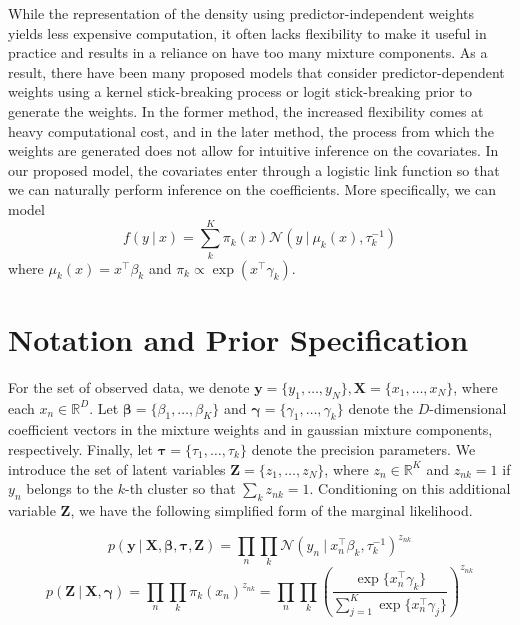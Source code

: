 \documentclass[twoside,11pt]{article}
\newcommand\given[1][]{\:#1\vert\:}
\newcommand{\transpose}[1]{#1^{\intercal}}
\newcommand{\R}{\mathbb{R}}
\newcommand{\nprod}{\prod_{n}}
\newcommand{\kprod}{\prod_{k}}
\newcommand{\boldbeta}{\boldsymbol\beta}
\newcommand{\boldgamma}{\boldsymbol\gamma}
\newcommand{\boldtau}{\boldsymbol\tau}
\newcommand{\sumexp}{\sum_{j=1}^{K} \exp \{ \transpose{x_n} \gamma_j \}}
\begin{document}
While the representation of the density using predictor-independent weights yields less expensive computation, it often lacks flexibility to make it useful in practice and results in a reliance on have too many mixture components. As a result, there have been many proposed models that consider predictor-dependent weights using a kernel stick-breaking process \parencite{dunsonpark:08} or logit stick-breaking prior \parencite{durante:17} to generate the weights. In the former method, the increased flexibility comes at heavy computational cost, and in the later method, the process from which the weights are generated does not allow for intuitive inference on the covariates. In our proposed model, the covariates enter through a logistic link function so that we can naturally perform inference on the coefficients. More specifically, we can model
\begin{equation} \label{eq:covdep_gm}
	 f(y \given x) = \sum_{k}^{K} \pi_k(x) \mathcal{N} \left( y \given \mu_k(x), \tau_k^{-1} \right) 
\end{equation} 
where $\mu_k(x) = \transpose{x} \beta_k$ and $\pi_{k} \propto \exp(\transpose{x} \gamma_k)$. 

\section{Notation and Prior Specification}
For the set of observed data, we denote $\mathbf{y} = \{y_1, \ldots, y_N \}, \mathbf{X} = \{ x_1, \ldots, x_N \}$, where each $x_n \in \R^{D}$. Let $\boldbeta = \{ \beta_1, \ldots, \beta_K\}$ and $\boldgamma = \{ \gamma_1, \ldots, \gamma_k\}$ denote the $D$-dimensional coefficient vectors  in the mixture weights and in gaussian mixture components, respectively. Finally, let $\boldtau = \{ \tau_1, \ldots, \tau_k \}$ denote the precision parameters. We introduce the set of latent variables $\mathbf{Z} = \{ z_1, \ldots, z_N \}$, where $z_n \in \R^K$ and $z_{nk} = 1$ if $y_n$ belongs to the $k$-th cluster so that $\sum_{k} z_{nk} = 1$. Conditioning on this additional variable $\mathbf{Z}$, we have the following simplified form of the marginal likelihood. 


\begin{equation} \label{eq:simp_lik}
	p \left( \mathbf{y} \given \mathbf{X}, \boldsymbol\beta, \boldsymbol{\tau}, \mathbf{Z} \right) = 
	\prod_{n} \prod_{k} \mathcal{N} \left( y_n \given \transpose{x_n} \beta_k, \tau_{k}^{-1} \right)^{z_{nk}}
\end{equation}
\begin{equation} \label{eq:z_prior}
	p \left( \mathbf{Z} \given \mathbf{X}, \boldsymbol\gamma \right) = \nprod \kprod \pi_{k} (x_n)^{z_{nk}} = 
	\nprod \kprod \left( \frac{\exp\{\transpose{x_n} \gamma_k\}}{\sumexp}\right)^{z_{nk}}
\end{equation}
\end{document}
